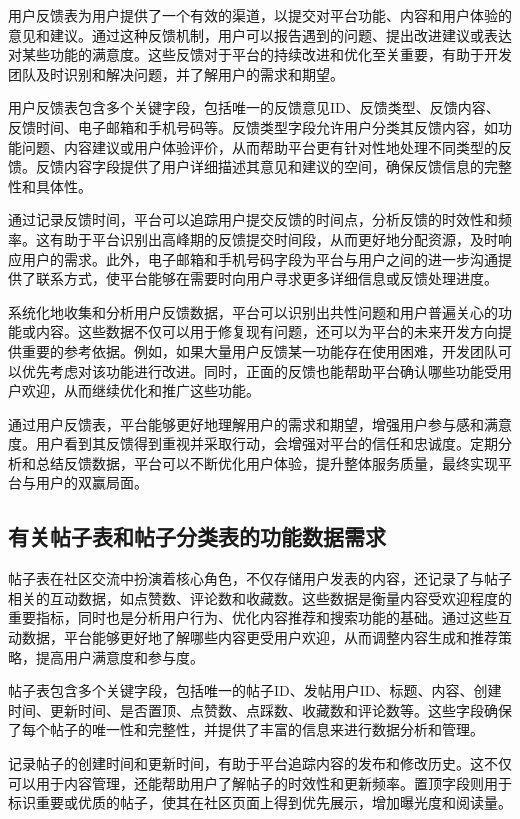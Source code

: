 用户反馈表为用户提供了一个有效的渠道，以提交对平台功能、内容和用户体验的意见和建议。通过这种反馈机制，用户可以报告遇到的问题、提出改进建议或表达对某些功能的满意度。这些反馈对于平台的持续改进和优化至关重要，有助于开发团队及时识别和解决问题，并了解用户的需求和期望。

用户反馈表包含多个关键字段，包括唯一的反馈意见ID、反馈类型、反馈内容、反馈时间、电子邮箱和手机号码等。反馈类型字段允许用户分类其反馈内容，如功能问题、内容建议或用户体验评价，从而帮助平台更有针对性地处理不同类型的反馈。反馈内容字段提供了用户详细描述其意见和建议的空间，确保反馈信息的完整性和具体性。

通过记录反馈时间，平台可以追踪用户提交反馈的时间点，分析反馈的时效性和频率。这有助于平台识别出高峰期的反馈提交时间段，从而更好地分配资源，及时响应用户的需求。此外，电子邮箱和手机号码字段为平台与用户之间的进一步沟通提供了联系方式，使平台能够在需要时向用户寻求更多详细信息或反馈处理进度。

系统化地收集和分析用户反馈数据，平台可以识别出共性问题和用户普遍关心的功能或内容。这些数据不仅可以用于修复现有问题，还可以为平台的未来开发方向提供重要的参考依据。例如，如果大量用户反馈某一功能存在使用困难，开发团队可以优先考虑对该功能进行改进。同时，正面的反馈也能帮助平台确认哪些功能受用户欢迎，从而继续优化和推广这些功能。

通过用户反馈表，平台能够更好地理解用户的需求和期望，增强用户参与感和满意度。用户看到其反馈得到重视并采取行动，会增强对平台的信任和忠诚度。定期分析和总结反馈数据，平台可以不断优化用户体验，提升整体服务质量，最终实现平台与用户的双赢局面。

\subsection{有关帖子表和帖子分类表的功能数据需求}

帖子表在社区交流中扮演着核心角色，不仅存储用户发表的内容，还记录了与帖子相关的互动数据，如点赞数、评论数和收藏数。这些数据是衡量内容受欢迎程度的重要指标，同时也是分析用户行为、优化内容推荐和搜索功能的基础。通过这些互动数据，平台能够更好地了解哪些内容更受用户欢迎，从而调整内容生成和推荐策略，提高用户满意度和参与度。

帖子表包含多个关键字段，包括唯一的帖子ID、发帖用户ID、标题、内容、创建时间、更新时间、是否置顶、点赞数、点踩数、收藏数和评论数等。这些字段确保了每个帖子的唯一性和完整性，并提供了丰富的信息来进行数据分析和管理。

记录帖子的创建时间和更新时间，有助于平台追踪内容的发布和修改历史。这不仅可以用于内容管理，还能帮助用户了解帖子的时效性和更新频率。置顶字段则用于标识重要或优质的帖子，使其在社区页面上得到优先展示，增加曝光度和阅读量。

